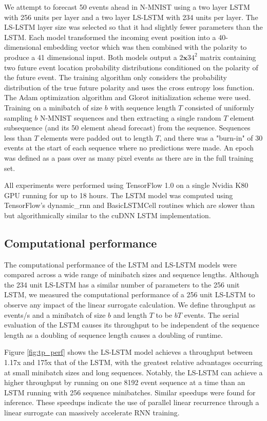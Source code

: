 \documentclass{article}
\begin{document}
We attempt to forecast 50 events ahead in N-MNIST using a two layer LSTM with 256 units per layer and a two layer LS-LSTM with 234 units per layer. The LS-LSTM layer size was selected so that it had slightly fewer parameters than the LSTM. Each model transformed the incoming event position into a 40-dimensional embedding vector which was then combined with the polarity to produce a 41 dimensional input. Both models output a $2 \mathbf{x} 34^2$ matrix containing two future event location probability distributions conditioned on the polarity of the future event. The training algorithm only considers the probability distribution of the true future polarity and uses the cross entropy loss function. The Adam \cite{kingma2014adam} optimization algorithm and Glorot \cite{glorot2010understanding} initialization scheme were used. Training on a minibatch of size $b$ with sequence length $T$ consisted of uniformly sampling $b$ N-MNIST sequences and then extracting a single random $T$ element subsequence (and its 50 element ahead forecast) from the sequence. Sequences less than $T$ elements were padded out to length $T$, and there was a "burn-in" of 30 events at the start of each sequence where no predictions were made. An epoch was defined as a pass over as many pixel events as there are in the full training set.

All experiments were performed using TensorFlow 1.0 \cite{abadi2016tensorflow} on a single Nvidia K80 GPU running for up to 18 hours. The LSTM model was computed using TensorFlow's dynamic\_rnn and BasicLSTMCell routines which are slower than but algorithmically similar to the cuDNN LSTM implementation.

\subsection{Computational performance}
The computational performance of the LSTM and LS-LSTM models were compared across a wide range of minibatch sizes and sequence lengths. Although the 234 unit LS-LSTM has a similar number of parameters to the 256 unit LSTM, we measured the computational performance of a 256 unit LS-LSTM to observe any impact of the linear surrogate calculation. We define throughput as events/s and a minibatch of size $b$ and length $T$ to be $bT$ events. The serial evaluation of the LSTM causes its throughput to be independent of the sequence length as a doubling of sequence length causes a doubling of runtime.

Figure \ref{fig:tp_perf} shows the LS-LSTM model achieves a throughput between 1.17x and 175x that of the LSTM, with the greatest relative advantages occurring at small minibatch sizes and long sequences. Notably, the LS-LSTM can achieve a higher throughput by running on one 8192 event sequence at a time than an LSTM running with 256 sequence minibatches. Similar speedups were found for inference. These speedups indicate the use of parallel linear recurrence through a linear surrogate can massively accelerate RNN training.
\end{document}
